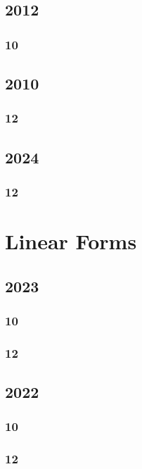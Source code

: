 \documentclass[11pt]{book}
\begin{document}
\section{2012}
\subsection{10}


\section{2010}
\subsection{12}


\section{2024}
\subsection{12}


\chapter{Linear Forms}
\section{2023}
\subsection{10}

\subsection{12}                                                                                                  

\section{2022}
\subsection{10}

\subsection{12}

\end{document}
